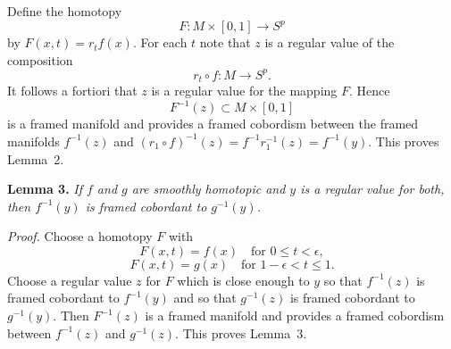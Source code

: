 Define the homotopy
\[
F : M \times [0, 1] \to S^p
\]
by $F(x, t) = r_t f(x)$. For each $t$ note that $z$ is a regular value of the composition
\[
r_t \circ f : M \to S^p.
\]
It follows a fortiori that $z$ is a regular value for the mapping $F$. Hence
\[
F^{-1}(z) \subset M \times [0, 1]
\]
is a framed manifold and provides a framed cobordism between the framed manifolds $f^{-1}(z)$ and $(r_1 \circ f)^{-1}(z) = f^{-1} r_1^{-1}(z) = f^{-1}(y)$. This proves Lemma~2.

\noindent\textbf{Lemma 3.} \textit{If $f$ and $g$ are smoothly homotopic and $y$ is a regular value for both, then $f^{-1}(y)$ is framed cobordant to $g^{-1}(y)$.}

\noindent\textit{Proof.}
Choose a homotopy $F$ with
\[
F(x, t) = f(x) \quad \text{for } 0 \le t < \epsilon,
\]
\[
F(x, t) = g(x) \quad \text{for } 1 - \epsilon < t \le 1.
\]
Choose a regular value $z$ for $F$ which is close enough to $y$ so that $f^{-1}(z)$ is framed cobordant to $f^{-1}(y)$ and so that $g^{-1}(z)$ is framed cobordant to $g^{-1}(y)$. Then $F^{-1}(z)$ is a framed manifold and provides a framed cobordism between $f^{-1}(z)$ and $g^{-1}(z)$. This proves Lemma~3.

